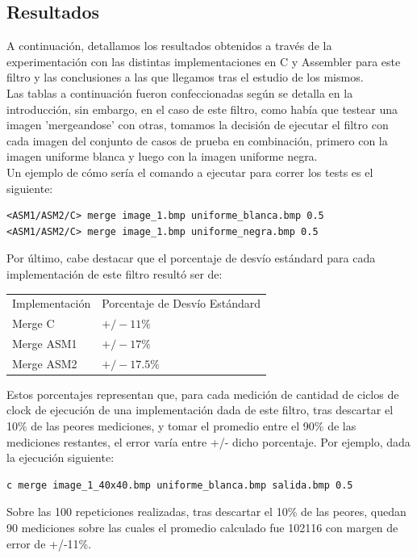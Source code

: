 \subsection{Resultados}
A continuación, detallamos los resultados obtenidos a través de la experimentación con las distintas implementaciones en C y Assembler para este filtro y las conclusiones a las que llegamos tras el estudio de los mismos.\\

Las tablas a continuación fueron confeccionadas según se detalla en la introducción, sin embargo, en el caso de este filtro, como había que testear una imagen 'mergeandose' con otras, tomamos la decisión de ejecutar el filtro con cada imagen del conjunto de casos de prueba en combinación, primero con la imagen uniforme blanca y luego con la imagen uniforme negra.\\
Un ejemplo de cómo sería el comando a ejecutar para correr los tests es el siguiente:\\
\begin{verbatim}
<ASM1/ASM2/C> merge image_1.bmp uniforme_blanca.bmp 0.5
<ASM1/ASM2/C> merge image_1.bmp uniforme_negra.bmp 0.5 
\end{verbatim}

Por último, cabe destacar que el porcentaje de desvío estándard para cada implementación de este filtro resultó ser de:
\begin{tabular}{| l | l |}
\hline
Implementación & Porcentaje de Desvío Estándard \\
Merge C	& $+/- 11\%$\\
Merge ASM1 & 	$+/- 17\%$\\
Merge ASM2	& $+/- 17.5\%$\\
\hline
\end{tabular}

Estos porcentajes representan que, para cada medición de cantidad de ciclos de clock de ejecución de una implementación dada de este filtro, tras descartar el 10\% de las peores mediciones, y tomar el promedio entre el 90\% de las mediciones restantes, el error varía entre +/- dicho porcentaje. Por ejemplo, dada la ejecución siguiente:

\begin{verbatim}
c merge image_1_40x40.bmp uniforme_blanca.bmp salida.bmp 0.5
\end{verbatim}
Sobre las 100 repeticiones realizadas, tras descartar el 10\% de las peores, quedan 90 mediciones sobre las cuales el promedio calculado fue 102116 con margen de error de +/-11\%.\\

